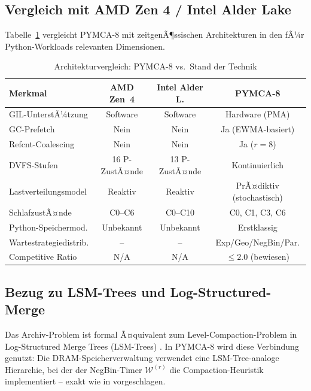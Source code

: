 ﻿\documentclass[a4paper,12pt]{scrreprt}
\theoremstyle{definition}
\begin{document}
	\subsection{Vergleich mit AMD Zen 4 / Intel Alder Lake}
	
	Tabelle~\ref{tab:sota} vergleicht PYMCA-8 mit zeitgenÃ¶ssischen
	Architekturen in den fÃ¼r Python-Workloads relevanten Dimensionen.
	
	\begin{table}[H]
		\centering
		\caption{Architekturvergleich: PYMCA-8 vs.\ Stand der Technik}
		\label{tab:sota}
		\renewcommand{\arraystretch}{1.35}
		\begin{tabular}{p{4.5cm}ccc}
			\toprule
			\textbf{Merkmal} & \textbf{AMD Zen~4} & \textbf{Intel Alder L.}
			& \textbf{PYMCA-8} \\
			\midrule
			GIL-UnterstÃ¼tzung & Software & Software & Hardware (PMA) \\
			GC-Prefetch & Nein & Nein & Ja (EWMA-basiert) \\
			Refcnt-Coalescing & Nein & Nein & Ja ($r=8$) \\
			DVFS-Stufen & 16 P-ZustÃ¤nde & 13 P-ZustÃ¤nde & Kontinuierlich \\
			Lastverteilungsmodel & Reaktiv & Reaktiv & PrÃ¤diktiv (stochastisch) \\
			SchlafzustÃ¤nde & C0--C6 & C0--C10 & C0, C1, C3, C6 \\
			Python-Speichermod. & Unbekannt & Unbekannt & Erstklassig \\
			Wartestrategiedistrib. & -- & -- & Exp/Geo/NegBin/Par. \\
			Competitive Ratio & N/A & N/A & $\le 2.0$ (bewiesen) \\
			\bottomrule
		\end{tabular}
	\end{table}
	
	\subsection{Bezug zu LSM-Trees und Log-Structured-Merge}
	
	Das Archiv-Problem ist formal Ã¤quivalent zum Level-Compaction-Problem
	in Log-Structured Merge Trees (LSM-Trees) \cite{o1996log}. In PYMCA-8
	wird diese Verbindung genutzt: Die DRAM-Speicherverwaltung verwendet
	eine LSM-Tree-analoge Hierarchie, bei der der NegBin-Timer
	$\mathcal{W}^{(r)}$ die Compaction-Heuristik implementiert -- exakt
	wie in \cite{epp2026archiv} vorgeschlagen.
	
\end{document}

